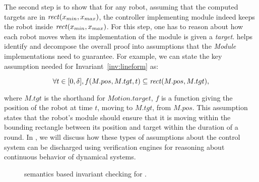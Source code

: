 The second step is to show that for any robot, assuming that the computed targets are in $\mathit{rect}(x_{min}, x_{max})$,
the controller implementing \Motion module indeed keeps the robot inside $\mathit{rect}(x_{min}, x_{max})$.
%
For this step, one has to reason about how each robot moves when its implementation of the \Motion module is given a \emph{target}.
\lgname helps identify and decompose the overall proof into assumptions that the \emph{Module} implementations need to guarantee.
For example, we can state the key assumption needed for Invariant~\ref{inv:lineform} as:
\begin{assumption}
\label{lineform-assume}
\[
\forall t \in [0, \delta], f(M.pos, M.tgt, t) \subseteq \mathit{rect}(M.pos, M.tgt),
\]
\end{assumption}
\noindent
where $M.tgt$ is the shorthand for $Motion.target$,
$f$ is a function giving the position of the robot at time $t$, moving to $M.tgt$, from $M.pos$.
This assumption states that the robot's \Motion module should ensure that it is moving within the bounding rectangle between its position and target within the duration of a round.
In , we will discuss how these types of assumptions about the control system can be discharged using verification engines for reasoning about continuous behavior of dynamical systems.

\begin{figure}
            \captionsetup{font=scriptsize}
\caption{\K semantics based invariant checking for \lgname.}
\label{fig:tools}
\end{figure}


